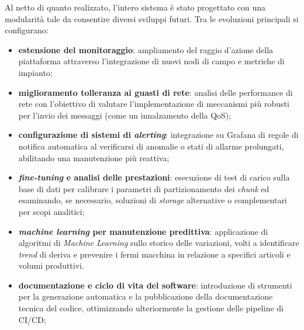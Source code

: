 \documentclass[12pt]{article}
\begin{document}
    Al netto di quanto realizzato, l'intero sistema è stato progettato con una modularità tale da consentire diversi sviluppi futuri. Tra le evoluzioni principali si configurano:
    \begin{itemize}
        \item \textbf{estensione del monitoraggio}: ampliamento del raggio d'azione della piattaforma attraverso l'integrazione di nuovi nodi di campo e metriche di impianto;
        \item \textbf{miglioramento tolleranza ai guasti di rete}: analisi delle performance di rete con l'obiettivo di valutare l'implementazione di meccanismi più robusti per l'invio dei messaggi (come un innalzamento della QoS);
        \item \textbf{configurazione di sistemi di \textit{alerting}}: integrazione su Grafana di regole di notifica automatica al verificarsi di anomalie o stati di allarme prolungati, abilitando una manutenzione più reattiva;
        \item \textbf{\textit{fine-tuning} e analisi delle prestazioni}: esecuzione di test di carico sulla base di dati per calibrare i parametri di partizionamento dei \textit{chunk} ed esaminando, se necessario, soluzioni di \textit{storage} alternative o complementari per scopi analitici;
        \item \textbf{\textit{machine learning} per manutenzione predittiva}: applicazione di algoritmi di \textit{Machine Learning} sullo storico delle variazioni, volti a identificare \textit{trend} di deriva e prevenire i fermi macchina in relazione a specifici articoli e volumi produttivi.
        \item \textbf{documentazione e ciclo di vita del software}: introduzione di strumenti per la generazione automatica e la pubblicazione della documentazione tecnica del codice, ottimizzando ulteriormente la gestione delle pipeline di CI/CD;
    \end{itemize}
    
\end{document}

